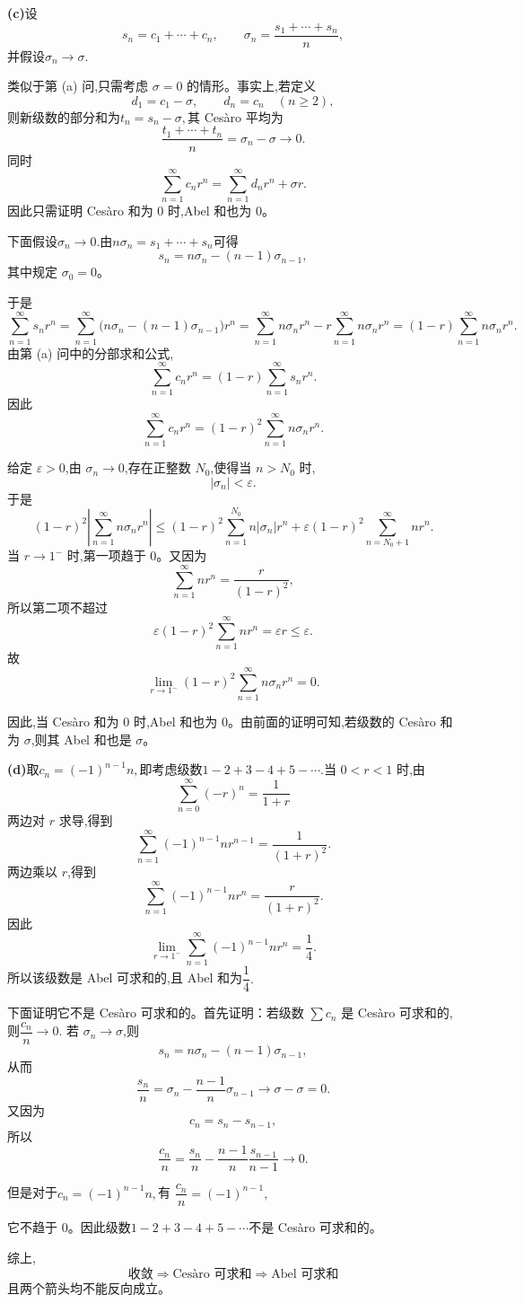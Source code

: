\begin{solution}
	\textbf{(c)}设
	\[
	s_n=c_1+\cdots+c_n,
	\qquad
	\sigma_n=\frac{s_1+\cdots+s_n}{n},
	\]
	并假设$\sigma_n\to\sigma.$
	
	类似于第 (a) 问,只需考虑 $\sigma=0$ 的情形。事实上,若定义
	\[
	d_1=c_1-\sigma,\qquad d_n=c_n\quad(n\geq2),
	\]
	则新级数的部分和为$t_n=s_n-\sigma,$其 Ces\`aro 平均为
	\[
	\frac{t_1+\cdots+t_n}{n}
	=\sigma_n-\sigma\to0.
	\]
	同时
	\[
	\sum_{n=1}^{\infty}c_nr^n
	=\sum_{n=1}^{\infty}d_nr^n+\sigma r.
	\]
	因此只需证明 Ces\`aro 和为 $0$ 时,Abel 和也为 $0$。
	
	下面假设$\sigma_n\to0.$由$n\sigma_n=s_1+\cdots+s_n$可得
	\[
	s_n=n\sigma_n-(n-1)\sigma_{n-1},
	\]
	其中规定 $\sigma_0=0$。
	
	于是
	\[\sum_{n=1}^{\infty}s_nr^n
	=\sum_{n=1}^{\infty}
	\bigl(n\sigma_n-(n-1)\sigma_{n-1}\bigr)r^n
	=\sum_{n=1}^{\infty}n\sigma_nr^n
	-r\sum_{n=1}^{\infty}n\sigma_nr^n
	=(1-r)\sum_{n=1}^{\infty}n\sigma_nr^n.
	\]
	由第 (a) 问中的分部求和公式,
	\[
	\sum_{n=1}^{\infty}c_nr^n
	=(1-r)\sum_{n=1}^{\infty}s_nr^n.
	\]
	因此
	\[
	\sum_{n=1}^{\infty}c_nr^n
	=(1-r)^2\sum_{n=1}^{\infty}n\sigma_nr^n.
	\]
	
	给定 $\varepsilon>0$,由 $\sigma_n\to0$,存在正整数 $N_0$,使得当 $n>N_0$ 时,
	\[
	|\sigma_n|<\varepsilon.
	\]
	于是
	\[(1-r)^2
	\left|\sum_{n=1}^{\infty}n\sigma_nr^n\right|
	\leq
	(1-r)^2\sum_{n=1}^{N_0}n|\sigma_n|r^n
	+
	\varepsilon(1-r)^2
	\sum_{n=N_0+1}^{\infty}nr^n.\]
	当 $r\to1^-$ 时,第一项趋于 $0$。又因为
	\[
	\sum_{n=1}^{\infty}nr^n=\frac{r}{(1-r)^2},
	\]
	所以第二项不超过
	\[
	\varepsilon(1-r)^2
	\sum_{n=1}^{\infty}nr^n
	=\varepsilon r
	\leq\varepsilon.
	\]
	故
	\[
	\lim_{r\to1^-}
	(1-r)^2\sum_{n=1}^{\infty}n\sigma_nr^n=0.
	\]
	
	因此,当 Ces\`aro 和为 $0$ 时,Abel 和也为 $0$。由前面的证明可知,若级数的 Ces\`aro 和为 $\sigma$,则其 Abel 和也是 $\sigma$。
	
	\textbf{(d)}取$c_n=(-1)^{n-1}n,$即考虑级数$	1-2+3-4+5-\cdots.$当 $0<r<1$ 时,由
	\[
	\sum_{n=0}^{\infty}(-r)^n=\frac{1}{1+r}
	\]
	两边对 $r$ 求导,得到
	\[
	\sum_{n=1}^{\infty}(-1)^{n-1}nr^{n-1}
	=\frac{1}{(1+r)^2}.
	\]
	两边乘以 $r$,得到
	\[
	\sum_{n=1}^{\infty}(-1)^{n-1}nr^n
	=\frac{r}{(1+r)^2}.
	\]
	因此
	\[
	\lim_{r\to1^-}
	\sum_{n=1}^{\infty}(-1)^{n-1}nr^n
	=\frac14.
	\]
	所以该级数是 Abel 可求和的,且 Abel 和为$\dfrac14.$
	
	
	下面证明它不是 Ces\`aro 可求和的。首先证明：若级数 $\sum c_n$ 是 Ces\`aro 可求和的,则$\dfrac{c_n}{n}\to0.$
	若 $\sigma_n\to\sigma$,则
	\[
	s_n=n\sigma_n-(n-1)\sigma_{n-1},
	\]
	从而
	\[
	\frac{s_n}{n}
	=\sigma_n-\frac{n-1}{n}\sigma_{n-1}
	\to\sigma-\sigma=0.
	\]
	又因为
	\[
	c_n=s_n-s_{n-1},
	\]
	所以
	\[
	\frac{c_n}{n}
	=\frac{s_n}{n}
	-\frac{n-1}{n}\frac{s_{n-1}}{n-1}
	\to0.
	\]
	
	但是对于$c_n=(-1)^{n-1}n,$有	$\dfrac{c_n}{n}=(-1)^{n-1},$
	
	它不趋于 $0$。因此级数$1-2+3-4+5-\cdots$不是 Ces\`aro 可求和的。
	
	综上,
	\[
	\boxed{
		\text{收敛}
		\Longrightarrow
		\text{Ces\`aro 可求和}
		\Longrightarrow
		\text{Abel 可求和}
	}
	\]
	且两个箭头均不能反向成立。
\end{solution}
